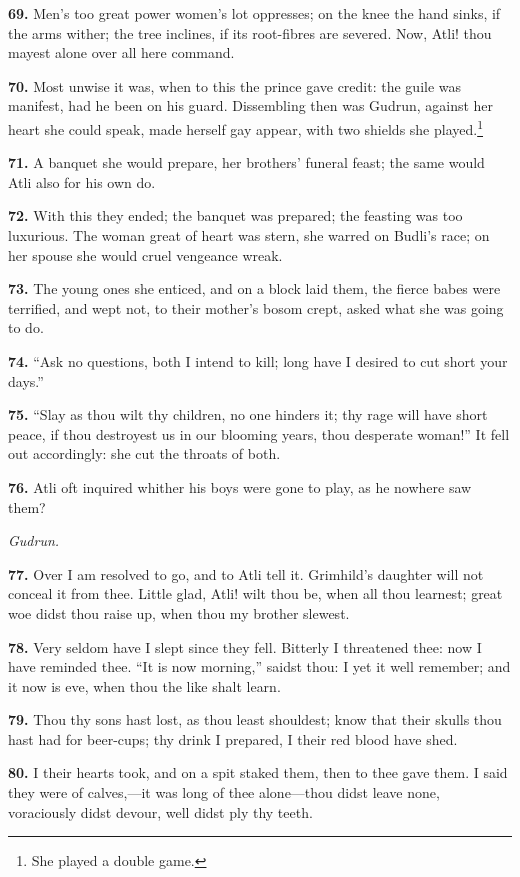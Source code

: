 \textbf{69.} Men's too great power women's lot oppresses; on the knee the
hand sinks, if the arms wither; the tree inclines, if its root-fibres
are severed. Now, Atli! thou mayest alone over all here command.

\textbf{70.} Most unwise it was, when to this the prince gave credit: the
guile was manifest, had he been on his guard. Dissembling then was
Gudrun, against her heart she could speak, made herself gay appear,
with two shields she played.\footnote{She played a double game.}

\textbf{71.} A banquet she would prepare, her brothers' funeral feast; the
same would Atli also for his own do.

\textbf{72.} With this they ended; the banquet was prepared; the feasting was
too luxurious. The woman great of heart was stern, she warred on
Budli's race; on her spouse she would cruel vengeance wreak.

\textbf{73.} The young ones she enticed, and on a block laid them, the fierce
babes were terrified, and wept not, to their mother's bosom crept,
asked what she was going to do.

\textbf{74.} ``Ask no questions, both I intend to kill; long have I desired to
cut short your days.''

\textbf{75.} ``Slay as thou wilt thy children, no one hinders it; thy rage
will have short peace, if thou destroyest us in our blooming years,
thou desperate woman!'' It fell out accordingly: she cut the throats of
both.

\textbf{76.} Atli oft inquired whither his boys were gone to play, as he
nowhere saw them?

\emph{Gudrun.}

\textbf{77.} Over I am resolved to go, and to Atli tell it. Grimhild's
daughter will not conceal it from thee. Little glad, Atli! wilt thou
be, when all thou learnest; great woe didst thou raise up, when thou
my brother slewest.

\textbf{78.} Very seldom have I slept since they fell. Bitterly I threatened
thee: now I have reminded thee. ``It is now morning,'' saidst thou: I
yet it well remember; and it now is eve, when thou the like shalt
learn.

\textbf{79.} Thou thy sons hast lost, as thou least shouldest; know that
their skulls thou hast had for beer-cups; thy drink I prepared, I
their red blood have shed.

\textbf{80.} I their hearts took, and on a spit staked them, then to thee
gave them. I said they were of calves,—it was long of thee
alone—thou didst leave none, voraciously didst devour, well didst ply
thy teeth.

